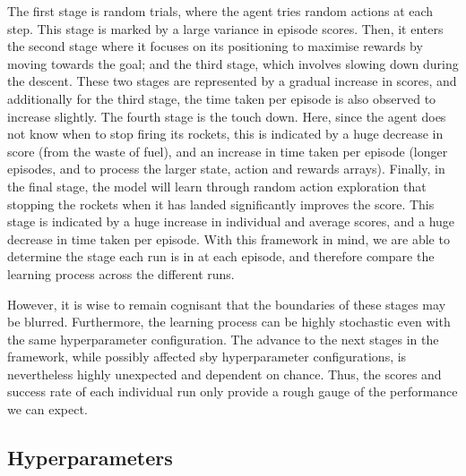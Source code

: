 \documentclass[a4paper, 11pt]{article}
\begin{document}
	The first stage is random trials, where the agent tries random actions at each step. This stage is marked by a large variance in episode scores. Then, it enters the second stage where it focuses on its positioning to maximise rewards by moving towards the goal; and the third stage, which involves slowing down during the descent. These two stages are represented by a gradual increase in scores, and additionally for the third stage, the time taken per episode is also observed to increase slightly. The fourth stage is the touch down. Here, since the agent does not know when to stop firing its rockets, this is indicated by a huge decrease in score (from the waste of fuel), and an increase in time taken per episode (longer episodes, and to process the larger state, action and rewards arrays). Finally, in the final stage, the model will learn through random action exploration that stopping the rockets when it has landed significantly improves the score. This stage is indicated by a huge increase in individual and average scores, and a huge decrease in time taken per episode. With this framework in mind, we are able to determine the stage each run is in at each episode, and therefore compare the learning process across the different runs. 
	
	However, it is wise to remain cognisant that the boundaries of these stages may be blurred. Furthermore, the learning process can be highly stochastic even with the same hyperparameter configuration. The advance to the next stages in the framework, while possibly affected sby hyperparameter configurations, is nevertheless highly unexpected and dependent on chance. Thus, the scores and success rate of each individual run only provide a rough gauge of the performance we can expect. 
	\subsection{Hyperparameters}
\end{document}
